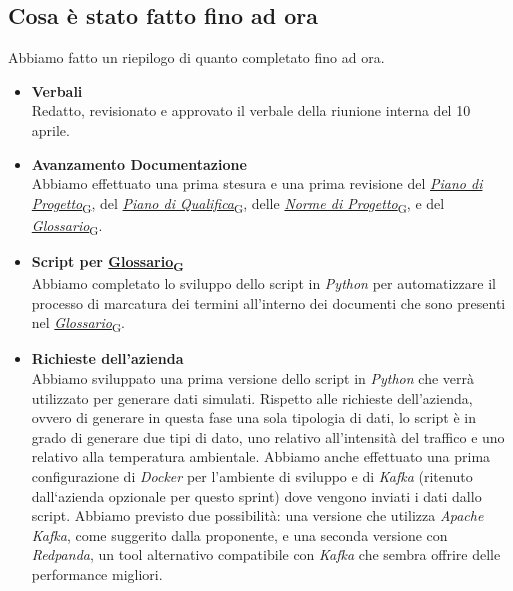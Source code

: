 \documentclass[italian,12pt]{article}
\begin{document}
\subsection{Cosa è stato fatto fino ad ora}
Abbiamo fatto un riepilogo di quanto completato fino ad ora.
\begin{itemize}
	\item \textbf{Verbali} \\
	Redatto, revisionato e approvato il verbale della riunione interna del 10 aprile.
	\item \textbf{Avanzamento Documentazione} \\
	Abbiamo effettuato una prima stesura e una prima revisione del \href{https://7last.github.io/docs/rtb/documentazione-interna/glossario#piano-di-progetto}{\textit{Piano di Progetto}\textsubscript{G}}, del \href{https://7last.github.io/docs/rtb/documentazione-interna/glossario#piano-di-qualifica}{\textit{Piano di Qualifica}\textsubscript{G}}, delle \href{https://7last.github.io/docs/rtb/documentazione-interna/glossario#norme-di-progetto}{\textit{Norme di Progetto}\textsubscript{G}}, e del \href{https://7last.github.io/docs/rtb/documentazione-interna/glossario#glossario}{\textit{Glossario}\textsubscript{G}}.
	\item \textbf{Script per \href{https://7last.github.io/docs/rtb/documentazione-interna/glossario#glossario}{Glossario\textsubscript{G}}} \\
	Abbiamo completato lo sviluppo dello script in \textit{Python} per automatizzare il processo di marcatura dei termini all'interno dei documenti che sono presenti nel \href{https://7last.github.io/docs/rtb/documentazione-interna/glossario#glossario}{\textit{Glossario}\textsubscript{G}}.
	\item \textbf{Richieste dell'azienda} \\
	Abbiamo sviluppato una prima versione dello script in \textit{Python} che verrà utilizzato per generare dati simulati. Rispetto alle richieste dell'azienda, ovvero di generare in questa fase una sola tipologia di dati, lo script è in grado di generare due tipi di dato, uno relativo all'intensità del traffico e uno relativo alla temperatura ambientale. Abbiamo anche effettuato una prima configurazione di \textit{Docker} per l'ambiente di sviluppo e di \textit{Kafka} (ritenuto dall`azienda opzionale per questo sprint) dove vengono inviati i dati dallo script. Abbiamo previsto due possibilità: una versione che utilizza \textit{Apache Kafka}, come suggerito dalla proponente, e una seconda versione con \textit{Redpanda}, un tool alternativo compatibile con \textit{Kafka} che sembra offrire delle performance migliori.
\end{itemize}
\end{document}
